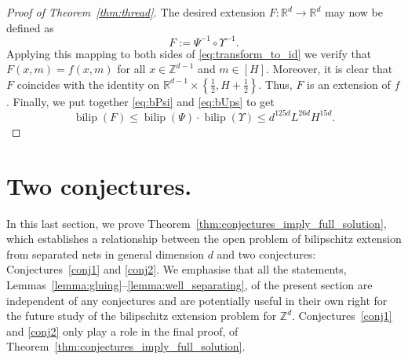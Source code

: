 \documentclass[a4paper, bibliography=totoc]{scrartcl}
\numberwithin{claimcounter}{define}
\newcommand{\R}{\mathbb{R}}
\newcommand{\Z}{\mathbb{Z}}
\newcommand{\bilip}{\operatorname{bilip}}
\newcommand{\set}[1]{\left\{#1\right\}}
\begin{document}
\begin{proof}[Proof of Theorem~\ref{thm:thread}]
	The desired extension $F\colon\R^{d}\to\R^{d}$ may now be defined as
	\begin{equation*}
	F:=\Psi^{-1}\circ \Upsilon^{-1}.
	\end{equation*}
	Applying this mapping to both sides of \eqref{eq:transform_to_id} we verify that $F(x,m)=f(x,m)$ for all $x\in\Z^{d-1}$ and $m\in [H]$. Moreover, it is clear that $F$ coincides with the identity on $\R^{d-1}\times \set{\frac{1}{2},H+\frac{1}{2}}$. 
	Thus, $F$ is an extension of $f$. Finally, we put together \eqref{eq:bPsi} and \eqref{eq:bUps} to get
	\begin{equation*}
	\bilip(F)\leq\bilip(\Psi)\cdot\bilip(\Upsilon)
	\leq d^{125d}L^{26d}H^{15d}.
	\end{equation*}
\end{proof}

\section{Two conjectures.}\label{sec:conjectures}
In this last section, we prove Theorem~\ref{thm:conjectures_imply_full_solution}, which establishes a relationship between the open problem of bilipschitz extension from separated nets in general dimension $d$ and two conjectures: Conjectures~\ref{conj1} and \ref{conj2}. We emphasise that all the statements, Lemmas~\ref{lemma:gluing}--\ref{lemma:well_separating}, of the present section are independent of any conjectures and are potentially useful in their own right for the future study of the bilipschitz extension problem for $\Z^{d}$. Conjectures~\ref{conj1} and \ref{conj2} only play a role in the final proof, of Theorem~\ref{thm:conjectures_imply_full_solution}.
\end{document}
